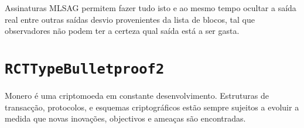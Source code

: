 
Assinaturas MLSAG permitem fazer tudo isto e ao mesmo tempo ocultar a saída real entre outras saídas desvio provenientes da lista de blocos, tal que observadores não podem ter a certeza qual saída está a ser gasta.
 

\section{{\tt RCTTypeBulletproof2}}
\label{sec:RCTTypeBulletproof2}

Monero é uma criptomoeda em constante desenvolvimento. Estruturas de transacção, protocolos, e esquemas criptográficos estão sempre sujeitos a evoluir a medida que novas inovações, objectivos e ameaças são encontradas.


